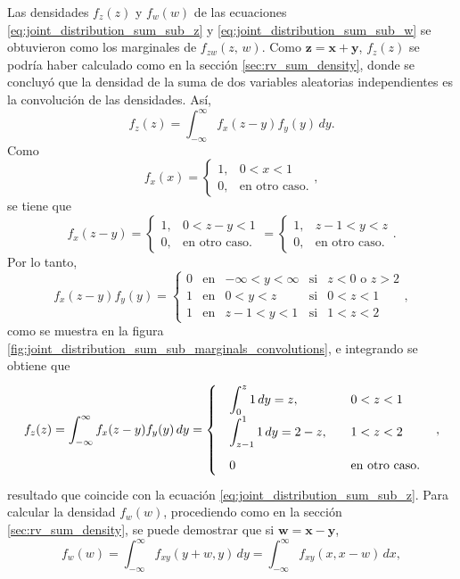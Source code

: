 \documentclass[a4paper]{report}
\newcommand{\x}{\mathbf{x}}
\newcommand{\y}{\mathbf{y}}
\newcommand{\w}{\mathbf{w}}
\newcommand{\z}{\mathbf{z}}
\begin{document}
Las densidades \(f_z(z)\) y \(f_w(w)\) de las ecuaciones \ref{eq:joint_distribution_sum_sub_z} y \ref{eq:joint_distribution_sum_sub_w} se obtuvieron como los marginales de \(f_{zw}(z,\,w)\). Como \(\z=\x+\y\), \(f_z(z)\) se podría haber calculado como en la sección \ref{sec:rv_sum_density}, donde se concluyó que la densidad de la suma de dos variables aleatorias independientes es la convolución de las densidades. Así,
\[
 f_z(z)=\int_{-\infty}^{\infty}f_x(z-y)f_y(y)\,dy.
\]
Como
\[
  f_x(x)=
 \left\{\begin{array}{ll}
   1, &  0<x<1\\
   0, & \textrm{en otro caso.}
 \end{array} \right., 
\]
se tiene que
\[
  f_x(z-y)=
 \left\{\begin{array}{ll}
   1, &  0<z-y<1\\
   0, & \textrm{en otro caso.}
 \end{array} \right.=
 \left\{\begin{array}{ll}
   1, &  z-1<y<z\\
   0, & \textrm{en otro caso.}
 \end{array} \right..
\]
Por lo tanto,
\begin{equation}\label{eq:joint_distribution_sum_sub_fz_deduction}
  f_x(z-y)f_y(y)=
 \left\{\begin{array}{llclc}
   0 &  \textrm{en} &-\infty<y<\infty & \textrm{si} & z<0\textrm{ o }z>2\\
   1 &  \textrm{en} & 0<y<z & \textrm{si} & 0<z<1\\
   1 &  \textrm{en} & z-1<y<1 & \textrm{si} & 1<z<2
 \end{array}\right., 
\end{equation}
como se muestra en la figura \ref{fig:joint_distribution_sum_sub_marginals_convolutions}, e integrando se obtiene que
\[
 f_z(z)=\int_{-\infty}^{\infty}f_x(z-y)f_y(y)\,dy
\def\arraystretch{2}\arraycolsep=10pt
 =\left\{\begin{array}{ll}
   \displaystyle\int_{0}^{z}1\,dy=z, &  0<z<1\\
   \displaystyle\int_{z-1}^{1}1\,dy=2-z, & 1<z<2\\ 
   0 & \textrm{en otro caso.}
 \end{array} \right., 
\]
resultado que coincide con la ecuación \ref{eq:joint_distribution_sum_sub_z}.
Para calcular la densidad \(f_w(w)\), procediendo como en la sección \ref{sec:rv_sum_density}, se puede demostrar que si \(\w=\x-\y\),
\[
 f_w(w)=\int_{-\infty}^{\infty}f_{xy}(y+w,y)\,dy=\int_{-\infty}^{\infty}f_{xy}(x,x-w)\,dx,
\]
\end{document}
